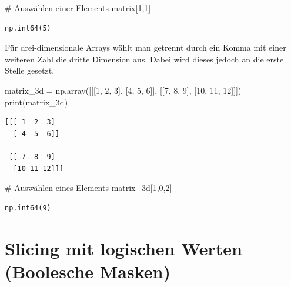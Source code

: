 \documentclass[
  letterpaper,
  DIV=11,
  numbers=noendperiod]{scrreprt}
\newenvironment{Shaded}{\begin{snugshade}}{\end{snugshade}}
\newcommand{\BuiltInTok}[1]{\textcolor[rgb]{0.00,0.23,0.31}{#1}}
\newcommand{\CommentTok}[1]{\textcolor[rgb]{0.37,0.37,0.37}{#1}}
\newcommand{\DecValTok}[1]{\textcolor[rgb]{0.68,0.00,0.00}{#1}}
\newcommand{\NormalTok}[1]{\textcolor[rgb]{0.00,0.23,0.31}{#1}}
\newcommand{\OperatorTok}[1]{\textcolor[rgb]{0.37,0.37,0.37}{#1}}
\begin{document}
\begin{Shaded}
\begin{Highlighting}[]
\CommentTok{\# Auswählen einer Elements}
\NormalTok{matrix[}\DecValTok{1}\NormalTok{,}\DecValTok{1}\NormalTok{]}
\end{Highlighting}
\end{Shaded}

\begin{verbatim}
np.int64(5)
\end{verbatim}

Für drei-dimensionale Arrays wählt man getrennt durch ein Komma mit
einer weiteren Zahl die dritte Dimension aus. Dabei wird dieses jedoch
an die erste Stelle gesetzt.

\begin{Shaded}
\begin{Highlighting}[]
\NormalTok{matrix\_3d }\OperatorTok{=}\NormalTok{ np.array([[[}\DecValTok{1}\NormalTok{, }\DecValTok{2}\NormalTok{, }\DecValTok{3}\NormalTok{], [}\DecValTok{4}\NormalTok{, }\DecValTok{5}\NormalTok{, }\DecValTok{6}\NormalTok{]], [[}\DecValTok{7}\NormalTok{, }\DecValTok{8}\NormalTok{, }\DecValTok{9}\NormalTok{], [}\DecValTok{10}\NormalTok{, }\DecValTok{11}\NormalTok{, }\DecValTok{12}\NormalTok{]]])}
\BuiltInTok{print}\NormalTok{(matrix\_3d)}
\end{Highlighting}
\end{Shaded}

\begin{verbatim}
[[[ 1  2  3]
  [ 4  5  6]]

 [[ 7  8  9]
  [10 11 12]]]
\end{verbatim}

\begin{Shaded}
\begin{Highlighting}[]
\CommentTok{\# Auswählen eines Elements}
\NormalTok{matrix\_3d[}\DecValTok{1}\NormalTok{,}\DecValTok{0}\NormalTok{,}\DecValTok{2}\NormalTok{]}
\end{Highlighting}
\end{Shaded}

\begin{verbatim}
np.int64(9)
\end{verbatim}

\section{Slicing mit logischen Werten (Boolesche
Masken)}\label{slicing-mit-logischen-werten-boolesche-masken}
\end{document}
